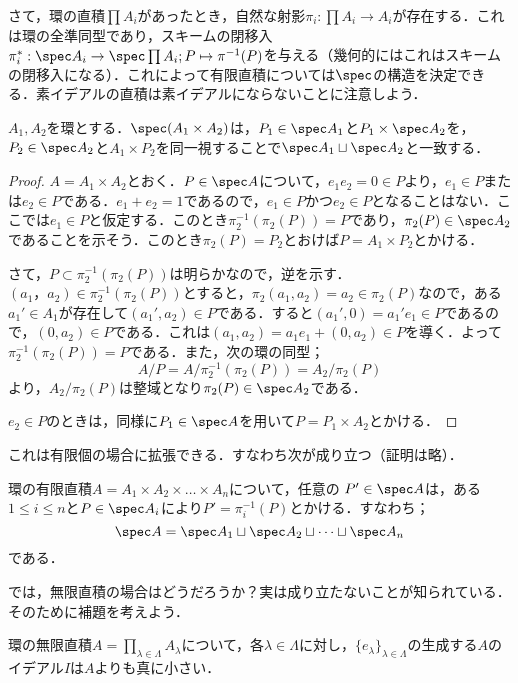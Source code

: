 さて，環の直積$\prod A_i$があったとき，自然な射影$\pi_i:\prod A_i\to A_i$が存在する．これは環の全準同型であり，スキームの閉移入$\pi_i^\ast:\spec A_i\to\spec\prod A_i;P\mapsto \pi^{-1}(P)$を与える（幾何的にはこれはスキームの閉移入になる）．これによって有限直積については$\spec$の構造を決定できる．素イデアルの直積は素イデアルにならないことに注意しよう．
\begin{prop}\label{prop:直積環のspec}
	$A_1,A_2$を環とする．$\spec (A_1\times A_2)$は，$P_1\in\spec A_1$と$P_1\times \spec A_2$を，$P_2\in\spec A_2$と$A_1\times P_2$を同一視することで$\spec A_1\sqcup\spec A_2$と一致する．
\end{prop}

\begin{proof}
	$A=A_1\times A_2$とおく．$P\in\spec A$について，$e_1e_2=0\in P$より，$e_1\in P$または$e_2\in P$である．$e_1+e_2=1$であるので，$e_1\in P$かつ$e_2\in P$となることはない．ここでは$e_1\in P$と仮定する．このとき$\pi_2^{-1}(\pi_2(P))=P$であり，$\pi_2(P)\in\spec A_2$であることを示そう．このとき$\pi_2(P)=P_2$とおけば$P=A_1\times P_2$とかける．
	
	さて，$P\subset\pi_2^{-1}(\pi_2(P))$は明らかなので，逆を示す．$(a_1，a_2)
	\in\pi_2^{-1}(\pi_2(P))$とすると，$\pi_2(a_1,a_2)=a_2\in\pi_2(P)$なので，ある$a_1'\in A_1$が存在して$(a_1',a_2)\in P$である．すると$(a_1',0)=a_1'e_1\in P$であるので，$(0,a_2)\in P$である．これは$(a_1,a_2)=a_1e_1+(0,a_2)\in P$を導く．よって$\pi_2^{-1}(\pi_2(P))=P$である．また，次の環の同型；
	\[A/P=A/\pi_2^{-1}(\pi_2(P))=A_2/\pi_2(P)\]
	より，$A_2/\pi_2(P)$は整域となり$\pi_2(P)\in\spec A_2$である．
	
	$e_2\in P$のときは，同様に$P_1\in\spec A$を用いて$P=P_1\times A_2$とかける．
\end{proof}

これは有限個の場合に拡張できる．すなわち次が成り立つ（証明は略）．

\begin{prop}
	環の有限直積$A=A_1\times A_2\times\dots\times A_n$について，任意の $P'\in\spec A$は，ある$1\leq i\leq n$と$P\in\spec A_i$により$P'=\pi_i^{-1}(P)$とかける．すなわち；
	\[\spec A=\spec A_1\sqcup\spec A_2\sqcup\dots\sqcup\spec A_n\]
	である．
\end{prop}

では，無限直積の場合はどうだろうか？実は成り立たないことが知られている．そのために補題を考えよう．

\begin{lem}
	環の無限直積$A=\prod_{\lambda\in\Lambda}A_\lambda$について，各$\lambda\in \Lambda$に対し，$\{e_\lambda\}_{\lambda\in\Lambda}$の生成する$A$のイデアル$I$は$A$よりも真に小さい．
\end{lem}

